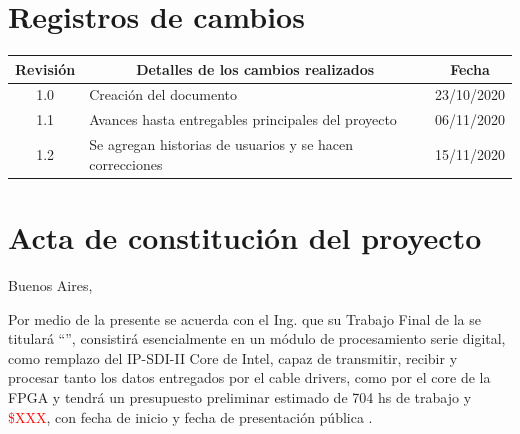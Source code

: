 \documentclass[11pt]{charter}
\begin{document}
\maketitle
\thispagestyle{empty}
\pagebreak


\thispagestyle{empty}
{\setlength{\parskip}{0pt}
\tableofcontents{}
}
\pagebreak


\section{Registros de cambios}
\label{sec:registro}


\begin{table}[ht]
\label{tab:registro}
\centering
\begin{tabularx}{\linewidth}{@{}|c|X|c|@{}}
\hline
\rowcolor[HTML]{C0C0C0} 
Revisión & \multicolumn{1}{c|}{\cellcolor[HTML]{C0C0C0}Detalles de los cambios realizados} & Fecha      \\ \hline
1.0      & Creación del documento                                          & 23/10/2020 \\ \hline
1.1      & Avances hasta entregables principales del proyecto & 06/11/2020 \\ \hline
1.2      & Se agregan historias de usuarios y se hacen correcciones & 15/11/2020 \\ \hline
\end{tabularx}
\end{table}

\pagebreak

\section{Acta de constitución del proyecto}
\label{sec:acta}

\begin{flushright}
Buenos Aires, \fechaInicioName
\end{flushright}

\vspace{2cm}

Por medio de la presente se acuerda con el Ing. \authorname\hspace{1px} que su Trabajo Final de la \degreename\hspace{1px} se titulará ``\ttitle'', consistirá esencialmente en un módulo de procesamiento serie digital, como remplazo del IP-SDI-II Core de Intel, capaz de transmitir, recibir y procesar tanto los datos entregados por el cable drivers, como por el core de la FPGA y tendrá un presupuesto preliminar estimado de 704 hs de trabajo y \textcolor{red}{\$XXX}, con fecha de inicio \fechaInicioName\hspace{1px} y fecha de presentación pública \fechaFinalName.
\end{document}

